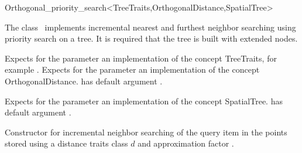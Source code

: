

\begin{ccRefClass}{Orthogonal_priority_search<TreeTraits,OrthogonalDistance,SpatialTree>}  %


\ccDefinition

The class \ccRefName\ implements incremental nearest and furthest neighbor searching
using priority search on a tree. It is required that the tree is
built with extended nodes.


\ccParameters

Expects for the parameter  an implementation of the concept TreeTraits,
for example .
Expects for the parameter  an implementation of the
concept OrthogonalDistance.  has default argument 
.

Expects for the parameter  an implementation of the concept SpatialTree.
 has default argument .

\ccTypes


\ccCreation
{}  %

{Constructor for incremental neighbor searching of the query item 
in the points stored  using a distance
traits class $d$ and approximation factor .}


\end{ccRefClass}
